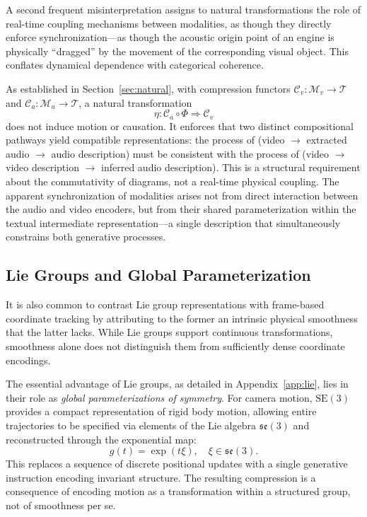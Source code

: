 \documentclass[11pt,a4paper]{article}
\theoremstyle{definition}
\theoremstyle{remark}
\begin{document}
A second frequent misinterpretation assigns to natural transformations the role of real-time coupling mechanisms between modalities, as though they directly enforce synchronization---as though the acoustic origin point of an engine is physically ``dragged'' by the movement of the corresponding visual object. This conflates dynamical dependence with categorical coherence.

As established in Section~\ref{sec:natural}, with compression functors $\mathcal{C}_v : \mathcal{M}_v \rightarrow \mathcal{T}$ and $\mathcal{C}_a : \mathcal{M}_a \rightarrow \mathcal{T}$, a natural transformation
\[
\eta : \mathcal{C}_a \circ \Phi \Rightarrow \mathcal{C}_v
\]
does not induce motion or causation. It enforces that two distinct compositional pathways yield compatible representations: the process of (video $\rightarrow$ extracted audio $\rightarrow$ audio description) must be consistent with the process of (video $\rightarrow$ video description $\rightarrow$ inferred audio description). This is a structural requirement about the commutativity of diagrams, not a real-time physical coupling. The apparent synchronization of modalities arises not from direct interaction between the audio and video encoders, but from their shared parameterization within the textual intermediate representation---a single description that simultaneously constrains both generative processes.

\subsection{Lie Groups and Global Parameterization}

It is also common to contrast Lie group representations with frame-based coordinate tracking by attributing to the former an intrinsic physical smoothness that the latter lacks. While Lie groups support continuous transformations, smoothness alone does not distinguish them from sufficiently dense coordinate encodings.

The essential advantage of Lie groups, as detailed in Appendix~\ref{app:lie}, lies in their role as \emph{global parameterizations of symmetry}. For camera motion, $\mathrm{SE}(3)$ provides a compact representation of rigid body motion, allowing entire trajectories to be specified via elements of the Lie algebra $\mathfrak{se}(3)$ and reconstructed through the exponential map:
\[
g(t) = \exp(t\xi), \quad \xi \in \mathfrak{se}(3).
\]
This replaces a sequence of discrete positional updates with a single generative instruction encoding invariant structure. The resulting compression is a consequence of encoding motion as a transformation within a structured group, not of smoothness per se.
\end{document}
